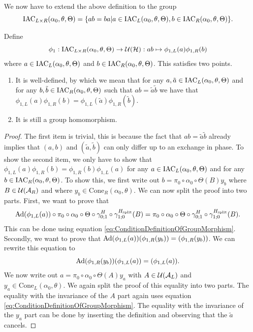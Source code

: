 \documentclass[11pt,a4paper,twoside]{article}
\numberwithin{equation}{section}
\begin{document}
	We now have to extend the above definition to the group
	\begin{equation}
		\textrm{IAC}_{L\times R}(\alpha_0,\theta,\Theta)=\{ab=ba|a\in\textrm{IAC}_{L}(\alpha_0,\theta,\Theta),b\in\textrm{IAC}_{R}(\alpha_0,\theta,\Theta)\}.
	\end{equation}
	\begin{lemma}\label{lem:extensionOfPhi1Definition}
		Define
		\begin{equation}
			\phi_1:\textrm{IAC}_{L\times R}(\alpha_0,\theta,\Theta)\rightarrow\mathcal U(\mathcal H):ab\mapsto \phi_{1,L}(a)\phi_{1,R}(b)
		\end{equation}
		where $a\in \textrm{IAC}_{L}(\alpha_0,\theta,\Theta)$ and $b\in \textrm{IAC}_{R}(\alpha_0,\theta,\Theta)$. This satisfies two points.
		\begin{enumerate}
			\item It is well-defined, by which we mean that for any $a,\tilde{a}\in \textrm{IAC}_{L}(\alpha_0,\theta,\Theta)$ and for any $b,\tilde{b}\in \textrm{IAC}_{R}(\alpha_0,\theta,\Theta)$ such that $ab=\tilde{a}\tilde{b}$ we have that $\phi_{1,L}(a)\phi_{1,R}(b)=\phi_{1,L}(\tilde a)\phi_{1,R}(\tilde b)$.
			\item It is still a group homomorphism.
		\end{enumerate}
	\end{lemma}
	\begin{proof}
		The first item is trivial, this is because the fact that $ab=\tilde{a}\tilde{b}$ already implies that $(a,b)$ and $(\tilde{a},\tilde{b})$ can only differ up to an exchange in phase. To show the second item, we only have to show that $\phi_{1,L}(a)\phi_{1,R}(b)=\phi_{1,R}(b)\phi_{1,L}(a)$ for any $a\in \textrm{IAC}_{L}(\alpha_0,\theta,\Theta)$ and for any $b\in \textrm{IAC}_{R}(\alpha_0,\theta,\Theta)$. To show this, we first write out $b=\pi_0\circ\alpha_0\circ\Theta(B)y_b$ where $B\in\mathcal U(\mathcal A_R)$ and where $y_b\in\textrm{Cone}_R(\alpha_0,\theta)$. We can now split the proof into two parts. First, we want to prove that
		\begin{equation}
			\Ad{\phi_{1,L}(a)}\circ\pi_0\circ\alpha_0\circ\Theta\circ\gamma_{0;1}^H\circ\gamma^\Hsplit_{1;0}(B)=\pi_0\circ\alpha_0\circ\Theta\circ\gamma_{0;1}^H\circ\gamma^\Hsplit_{1;0}(B).
		\end{equation}
		This can be done using equation \eqref{eq:ConditionDefinitionOfGroupMorphism}. Secondly, we want to prove that $\Ad{\phi_{1,L}(a)}(\phi_{1,R}(y_b))=(\phi_{1,R}(y_b))$. We can rewrite this equation to
		\begin{equation}
			\Ad{\phi_{1,R}(y_b)}(\phi_{1,L}(a))=(\phi_{1,L}(a)).
		\end{equation}
		We now write out $a=\pi_0\circ\alpha_0\circ\Theta(A)y_a$ with $A\in\mathcal U(\mathcal A_L)$ and $y_a\in\textrm{Cone}_L(\alpha_0,\theta)$. We again split the proof of this equality into two parts. The equality with the invariance of the $A$ part again uses equation \eqref{eq:ConditionDefinitionOfGroupMorphism}. The equality with the invariance of the $y_a$ part can be done by inserting the definition and observing that the $\tilde{a}$ cancels.
	\end{proof}
\end{document}
